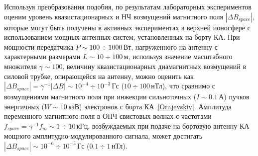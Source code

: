 \documentclass[autoref,10pt]{disser}
\begin{document}
Используя преобразования подобия, по результатам лабораторных экспериментов оценим уровень квазистационарных и НЧ возмущений магнитного поля $|\Delta B_{space}|$, которые могут быть получены в активных экспериментах в верхней ионосфере с использованием мощных антенных систем, установленных на борту КА. При мощности передатчика $P\sim100\div1000$\,Вт, нагруженного на антенну с характерными размерами $L\sim10\div100$\,м, используя значение масштабного множителя $\gamma\sim 100$, величину квазистационарных диамагнитных возмущений в силовой трубке, опирающейся на антенну, можно оценить как $|\Delta{}B_{space}|=\gamma{}^{-1}|\Delta{}B|\sim 10^{-4}\div 10^{-3}$\,Гс ($10\div100$\,нТл), что сравнимо с возмущениями магнитного поля при инжекции сильноточных ($I\sim 0.1$\,А) пучков энергичных ($W\sim 10$\,кэВ) электронов с борта КА~\ref{Orajevskiy}. Амплитуда переменного магнитного поля в ОНЧ свистовых волнах с частотами $f_{space}=\gamma{}^{-1} f_m\sim 1\div 10$\,кГц, возбуждаемых при подаче на бортовую антенну КА мощного амплитудно-модулированного сигнала, может достигать $|\Delta{}B_{space}|\sim 10^{-6}\div 10^{-5}$\,Гс ($0.1\div 1$\,нТл).  
\end{document}

